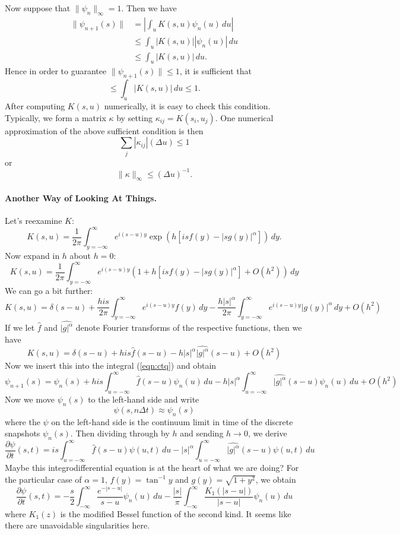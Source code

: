 \documentclass[11pt,letterpaper]{article}
\begin{document}
\noindent Now suppose that $\| \psi_n \|_\infty = 1$.  Then we have
\begin{align*}
\| \psi_{n+1} (s) \| &= \left| \int_u K(s,u) \psi_n(u) \, du \right| \\
 &\leq \int_u |K(s,u)| |\psi_n(u)| \, du \\
 &\leq \int_u |K(s,u)| \, du.
\end{align*}
Hence in order to guarantee $\| \psi_{n+1}(s) \| \leq 1$, it is sufficient that
\[
\leq \int_u |K(s,u)| \, du \leq 1.
\]
After computing $K(s,u)$ numerically, it is easy to check this condition.  Typically, we form a matrix $\kappa$ by setting $\kappa_{ij} = K(s_i, u_j)$.  One numerical approximation of the above sufficient condition is then
\[
\sum_{j} |\kappa_{ij}| (\Delta u) \leq 1
\]
or
\[
\| \kappa \|_\infty \leq (\Delta u)^{-1}.
\]

\paragraph{Another Way of Looking At Things.}
Let's reexamine $K$:
\[
K(s,u) = \frac{1}{2\pi}\int_{y=-\infty}^{\infty}e^{i (s-u) y} \exp{\left( h [ i s f(y) - |s g(y)|^\alpha ] \right)} \, dy.
\]
Now expand in $h$ about $h=0$:
\[
K(s,u) = \frac{1}{2 \pi} \int_{y=-\infty}^\infty e^{i (s-u) y} (1 + h [ i s f(y) - |s g(y) |^\alpha ]  + O(h^2) ) \, dy
\]
We can go a bit further:
\[
K(s,u) = \delta(s-u) + \frac{h i s}{2 \pi} \int_{y=-\infty}^\infty e^{i (s-u) y} f(y) \, dy - \frac{ h |s|^\alpha }{2 \pi} \int_{y=-\infty}^\infty e^{i (s-u) y} |g(y)|^\alpha \, dy + O(h^2)
\]
If we let $\widehat{f}$ and $\widehat{|g|^\alpha}$ denote Fourier transforms of the respective functions, then we have
\[
K(s,u) = \delta(s-u) + h i s \widehat{f}(s-u) - h |s|^\alpha \widehat{|g|^\alpha}(s-u) + O(h^2)
\]
Now we insert this into the integral (\ref{eqn:ctq}) and obtain
\[
\psi_{n+1}(s) = \psi_n(s) + h i s \int_{u=-\infty}^\infty \widehat{f}(s-u) \psi_n(u) \, du - h |s|^\alpha \int_{u=-\infty}^\infty \widehat{|g|^\alpha}(s-u) \psi_n(u) \, du + O(h^2)
\]
Now we move $\psi_n(s)$ to the left-hand side and write
\[
\psi(s, n \Delta t) \approx \psi_n(s)
\]
where the $\psi$ on the left-hand side is the continuum limit in time of the discrete snapshots $\psi_n(s)$.  Then dividing through by $h$ and sending $h \to 0$, we derive
\begin{equation}
\label{eqn:psicontevol}
\frac{\partial \psi}{\partial t} (s,t) = i s \int_{u=-\infty}^\infty  \widehat{f}(s-u) \psi(u,t) \, du - |s|^\alpha \int_{u=-\infty}^\infty \widehat{|g|^\alpha}(s-u) \psi(u,t) \, du
\end{equation}
Maybe this integrodifferential equation is at the heart of what we are doing?  For the particular case of $\alpha = 1$, $f(y) = \tan^{-1} y$ and $g(y) = \sqrt{1+y^2}$, we obtain
\[
\frac{\partial \psi}{\partial t} (s,t) = - \frac{s}{2} \int_{-\infty}^\infty \frac{e^{-|s-u|}}{s-u} \psi_n(u) \, du - \frac{|s|}{\pi} \int_{-\infty}^\infty \frac{K_1(|s-u|)}{|s-u|} \psi_n(u) \, du
\]
where $K_1(z)$ is the modified Bessel function of the second kind.  It seems like there are unavoidable singularities here.
\end{document}
